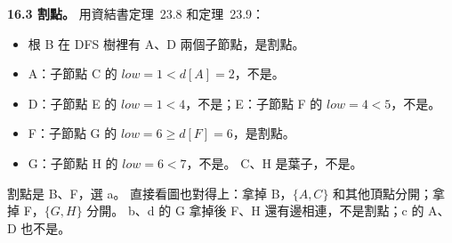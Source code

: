 \begin{pastsoln}
\textbf{16.3 割點。} 用資結書定理~23.8 和定理~23.9：
\begin{itemize}
\item 根 B 在 DFS 樹裡有 A、D 兩個子節點，是割點。
\item A：子節點 C 的 $\mathit{low} = 1 < d[A] = 2$，不是。
\item D：子節點 E 的 $\mathit{low} = 1 < 4$，不是；E：子節點 F 的 $\mathit{low} = 4 < 5$，不是。
\item F：子節點 G 的 $\mathit{low} = 6 \ge d[F] = 6$，是割點。
\item G：子節點 H 的 $\mathit{low} = 6 < 7$，不是。 C、H 是葉子，不是。
\end{itemize}
割點是 B、F，選 a。 直接看圖也對得上：拿掉 B，$\{A, C\}$ 和其他頂點分開；拿掉 F，$\{G, H\}$ 分開。
b、d 的 G 拿掉後 F、H 還有邊相連，不是割點；c 的 A、D 也不是。
\end{pastsoln}
